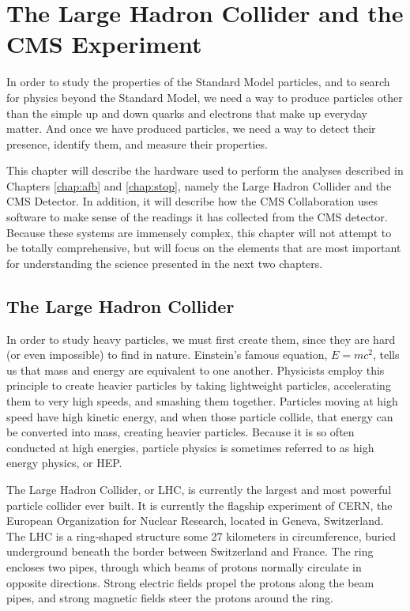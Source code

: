 \chapter{The Large Hadron Collider and the CMS Experiment}
\label{chap:hardware}

In order to study the properties of the Standard Model particles, and
to search for physics beyond the Standard Model, we need a way to
produce particles other than the simple up and down quarks and
electrons that make up everyday matter. And once we have produced
particles, we need a way to detect their presence, identify them, and
measure their properties.

This chapter will describe the hardware used to perform
the analyses described in Chapters \ref{chap:afb} and \ref{chap:stop},
namely the Large Hadron Collider and the CMS Detector. In addition, it
will describe how the CMS Collaboration uses software to make sense of
the readings it has collected from the CMS detector. Because these
systems are immensely complex, this chapter will not attempt to be
totally comprehensive, but will focus on the elements that are most
important for understanding the science presented in the next two
chapters. %

\section{The Large Hadron Collider}
\label{sec:lhc}

In order to study heavy particles, we must first create them, since
they are hard (or even impossible) to find in nature.
Einstein's famous equation, $E = mc^2$, tells us that mass and energy
are equivalent to one another. Physicists employ this principle to create
heavier particles by taking lightweight particles, accelerating them to very high
speeds, and smashing them together. Particles moving at high speed
have high kinetic energy, and when those particle collide, that energy
can be converted into mass, creating heavier particles. Because it is
so often conducted at high energies, particle physics is sometimes
referred to as high energy physics, or HEP.

The Large Hadron Collider, or LHC, is currently the largest and most
powerful particle collider ever built. %
It is currently the flagship experiment of CERN, the European Organization
for Nuclear Research, located in Geneva, Switzerland.
The LHC is a ring-shaped structure some 27 kilometers in circumference,
buried underground beneath the border between Switzerland and
France. The ring encloses two pipes, through which beams of
protons normally circulate in opposite directions. Strong electric fields
propel the protons along the beam pipes, and strong magnetic fields
steer the protons around the ring.

